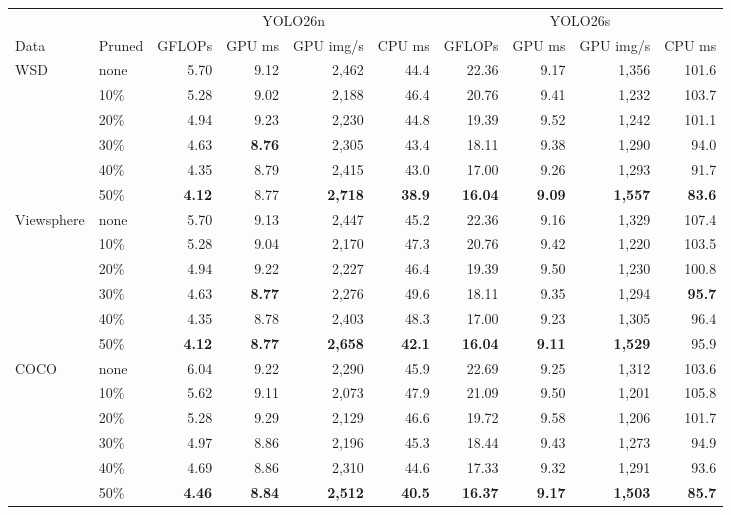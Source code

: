 \begin{tabular}{llrrrrrrrr}
\toprule
 & & \multicolumn{4}{c}{YOLO26n} & \multicolumn{4}{c}{YOLO26s} \\
\cmidrule(lr){3-6}\cmidrule(lr){7-10}
Data & Pruned & GFLOPs & GPU ms & GPU img/s & CPU ms & GFLOPs & GPU ms & GPU img/s & CPU ms \\
\midrule
WSD & none & 5.70 & 9.12 & 2,462 & 44.4 & 22.36 & 9.17 & 1,356 & 101.6 \\
 & 10\% & 5.28 & 9.02 & 2,188 & 46.4 & 20.76 & 9.41 & 1,232 & 103.7 \\
 & 20\% & 4.94 & 9.23 & 2,230 & 44.8 & 19.39 & 9.52 & 1,242 & 101.1 \\
 & 30\% & 4.63 & \textbf{8.76} & 2,305 & 43.4 & 18.11 & 9.38 & 1,290 & 94.0 \\
 & 40\% & 4.35 & 8.79 & 2,415 & 43.0 & 17.00 & 9.26 & 1,293 & 91.7 \\
 & 50\% & \textbf{4.12} & 8.77 & \textbf{2,718} & \textbf{38.9} & \textbf{16.04} & \textbf{9.09} & \textbf{1,557} & \textbf{83.6} \\
\midrule
Viewsphere & none & 5.70 & 9.13 & 2,447 & 45.2 & 22.36 & 9.16 & 1,329 & 107.4 \\
 & 10\% & 5.28 & 9.04 & 2,170 & 47.3 & 20.76 & 9.42 & 1,220 & 103.5 \\
 & 20\% & 4.94 & 9.22 & 2,227 & 46.4 & 19.39 & 9.50 & 1,230 & 100.8 \\
 & 30\% & 4.63 & \textbf{8.77} & 2,276 & 49.6 & 18.11 & 9.35 & 1,294 & \textbf{95.7} \\
 & 40\% & 4.35 & 8.78 & 2,403 & 48.3 & 17.00 & 9.23 & 1,305 & 96.4 \\
 & 50\% & \textbf{4.12} & \textbf{8.77} & \textbf{2,658} & \textbf{42.1} & \textbf{16.04} & \textbf{9.11} & \textbf{1,529} & 95.9 \\
\midrule
COCO & none & 6.04 & 9.22 & 2,290 & 45.9 & 22.69 & 9.25 & 1,312 & 103.6 \\
 & 10\% & 5.62 & 9.11 & 2,073 & 47.9 & 21.09 & 9.50 & 1,201 & 105.8 \\
 & 20\% & 5.28 & 9.29 & 2,129 & 46.6 & 19.72 & 9.58 & 1,206 & 101.7 \\
 & 30\% & 4.97 & 8.86 & 2,196 & 45.3 & 18.44 & 9.43 & 1,273 & 94.9 \\
 & 40\% & 4.69 & 8.86 & 2,310 & 44.6 & 17.33 & 9.32 & 1,291 & 93.6 \\
 & 50\% & \textbf{4.46} & \textbf{8.84} & \textbf{2,512} & \textbf{40.5} & \textbf{16.37} & \textbf{9.17} & \textbf{1,503} & \textbf{85.7} \\
\bottomrule
\end{tabular}
